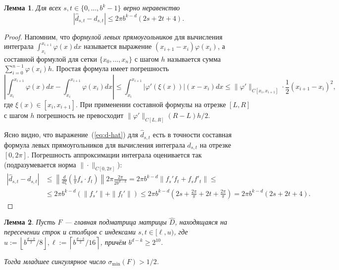 \documentclass[3p]{cmmp}%
\newtheorem{lemma}{Лемма}
\numberwithin{equation}{section}
\begin{document}
\begin{lemma}\label{lm:hatd}
	Для всех  $s, t \in \{0, \dots, b^{k}-1\}$ верно неравенство 
	\[
	|\widehat{d}_{s,t} - d_{s,t}| \leq 2\pi b^{k-d} (2s+2t+4).
	\]
\end{lemma}
\begin{proof}
	Напомним, что \emph{формулой левых прямоугольников} для вычисления интеграла $\int_{x_i}^{x_{i+1}}\varphi(x)dx$ называется выражение $(x_{i+1}-x_i)\varphi(x_i)$, а составной формулой для сетки $\{x_0, \dots, x_n\}$ с шагом $h$ называется сумма
	$
	\sum_{i=0}^{n-1}\varphi(x_i)h.
	$
	Простая формула имеет погрешность 
	\[
	\left|\int_{x_i}^{x_{i+1}} \varphi(x) d x - \int_{x_i}^{x_{i+1}} \varphi(x_i) d x\right|
	\le
	\int_{x_i}^{x_{i+1}} \left|\varphi'\left(\xi(x)\right)\right|(x-x_i)d x
	\le
	\| \varphi ' \|_{C[x_i,x_{i+1}]} \cdot \frac{1}{2} (x_{i+1}-x_i)^2,
	\]
	где $\xi(x) \in [x_i,x_{i+1}]$.
	При применении составной формулы на отрезке $[L,R]$ с шагом $h$ погрешность не превосходит $\| \varphi' \|_{C[L,R]} (R-L)h/2.$
	
	
	Ясно видно, что выражение~(\ref{eq:d-hat}) для $\widehat{d}_{s,t}$ есть в точности составная формула левых прямоугольников для вычисления интеграла $d_{s,t}$ на отрезке $[0, 2\pi]$.
	Погрешность аппроксимации интеграла оценивается так (подразумевается норма $\|\cdot\|_{C[0,2\pi]}$):
	\begin{align*}
	\left|\widehat{d}_{s,t}-d_{s,t}\right|
	&\le
	\left\| \frac{d}{d\xi} \left( \frac{1}{\pi} f_s\cdot f_t\right)\right\| 2\pi \frac{2 \pi}{2b^{d-k}}
	=
	2\pi b^{k-d} \left\| f_s'f_t+f_sf'_t\right\|
	\leq \\ &\le
	2\pi b^{k-d}\left( \| f_s'\| +  \| f_t'\| \right)
	\le
	2\pi b^{k-d} \left(2s+\frac{2\pi}{\pi}+2t +  \frac{2\pi}{\pi}\right)
	=
	2\pi b^{k-d} (2s+2t+4). 
	\end{align*}
\end{proof}
\begin{lemma}\label{lm:F}
	Пусть $F$ --- главная подматрица матрицы $\widehat{D}$, находящаяся на пересечении строк и столбцов с индексами $s,t \in [\ell, u)$,
	где  $u :=\left\lfloor b^{\frac{d-k}{2}}/8\right\rfloor, \ell := \left\lceil b^{\frac{d-k}{2}}/16\right\rceil$, причём $b^{d-k} \geq 2^{10}$.
	
	Тогда младшее сингулярное число $\sigma_{\min}(F) > 1/2$.
\end{lemma}
\end{document}
